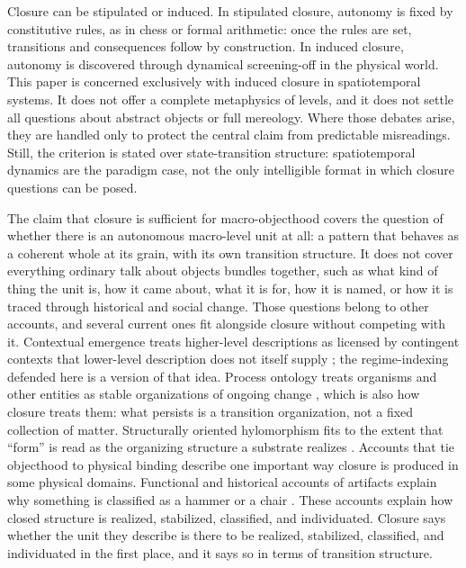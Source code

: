 Closure can be stipulated or induced. In stipulated closure, autonomy is fixed by constitutive
rules, as in chess or formal arithmetic: once the rules are set,
transitions and consequences follow by construction. In induced
closure, autonomy is discovered through dynamical screening-off in the
physical world. This paper is concerned exclusively with induced
closure in spatiotemporal systems. It does not offer a complete metaphysics of levels, and it does not settle
all questions about abstract objects or full mereology. Where those
debates arise, they are handled only to protect the central claim from
predictable misreadings. Still, the criterion is stated over
state-transition structure: spatiotemporal dynamics are the paradigm
case, not the only intelligible format in which closure questions can be
posed.

The claim that closure is sufficient for macro-objecthood covers the
question of whether there is
an autonomous macro-level unit at all: a pattern that behaves as a
coherent whole at its grain, with its own transition structure. It does
not cover everything ordinary talk about objects bundles together, such
as what kind of thing the unit is, how it came about, what it is for,
how it is named, or how it is traced through historical and social
change. Those questions belong to other accounts, and several current
ones fit alongside closure without competing with it. Contextual
emergence treats higher-level descriptions as licensed by contingent
contexts that lower-level description does not itself supply
\citep{bishopatmanspacher2006}; the regime-indexing defended here is a
version of that idea. Process ontology treats organisms and other
entities as stable organizations of ongoing change \citep{dupre2018},
which is also how closure treats them: what persists is a transition
organization, not a fixed collection of matter. Structurally oriented
hylomorphism fits to the extent that ``form'' is read as the organizing
structure a substrate realizes \citep{jaworski2016}. Accounts that tie
objecthood to physical binding describe one important way closure is
produced in some physical domains. Functional and historical accounts of
artifacts explain why something is classified as a hammer or a chair
\citep{thomasson2007}. These accounts explain how closed structure is
realized, stabilized, classified, and individuated. Closure says whether
the unit they describe is there to be realized, stabilized, classified,
and individuated in the first place, and it says so in terms of
transition structure.

